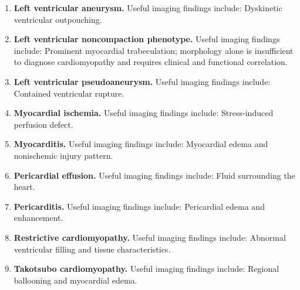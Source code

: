 \begin{enumerate}[leftmargin=*,itemsep=0.45em,topsep=0.4em]
\item \textbf{Left ventricular aneurysm.} Useful imaging findings include: Dyskinetic ventricular outpouching.
\item \textbf{Left ventricular noncompaction phenotype.} Useful imaging findings include: Prominent myocardial trabeculation; morphology alone is insufficient to diagnose cardiomyopathy and requires clinical and functional correlation.
\item \textbf{Left ventricular pseudoaneurysm.} Useful imaging findings include: Contained ventricular rupture.
\item \textbf{Myocardial ischemia.} Useful imaging findings include: Stress-induced perfusion defect.
\item \textbf{Myocarditis.} Useful imaging findings include: Myocardial edema and nonischemic injury pattern.
\item \textbf{Pericardial effusion.} Useful imaging findings include: Fluid surrounding the heart.
\item \textbf{Pericarditis.} Useful imaging findings include: Pericardial edema and enhancement.
\item \textbf{Restrictive cardiomyopathy.} Useful imaging findings include: Abnormal ventricular filling and tissue characteristics.
\item \textbf{Takotsubo cardiomyopathy.} Useful imaging findings include: Regional ballooning and myocardial edema.
\end{enumerate}

